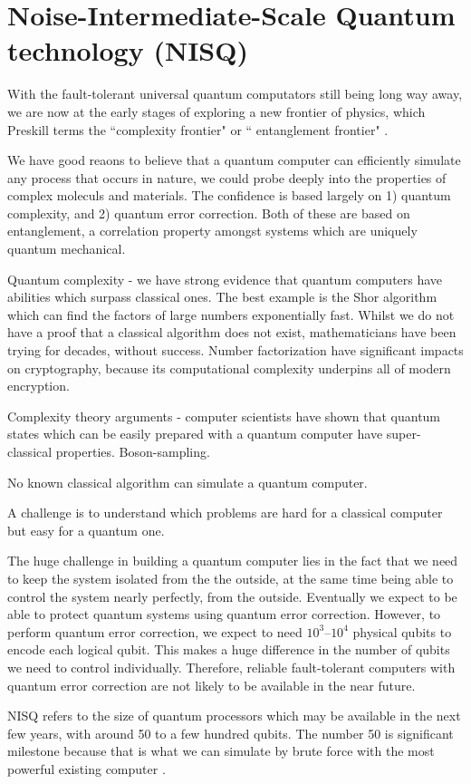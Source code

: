 \section{Noise-Intermediate-Scale Quantum technology (NISQ)}

With the fault-tolerant universal quantum computators still being long way away, we are now
at the early stages of exploring a new frontier of physics, which Preskill terms the 
``complexity frontier" or `` entanglement frontier" \cite{}.

We have good reaons to believe that a quantum computer can efficiently simulate any process that occurs in nature, we could probe deeply into the properties of complex moleculs and materials. The confidence is based largely on 1) quantum complexity, and 2) quantum error correction. Both of these are based on entanglement, a correlation property amongst systems which are uniquely quantum mechanical. 

Quantum complexity - we have strong evidence that quantum computers have abilities which surpass classical ones. The best example is the Shor algorithm \cite{} which can find the factors of large numbers exponentially fast. Whilst we do not have a proof that a classical algorithm does not exist, mathematicians have been trying for decades, without success. Number factorization have significant impacts on cryptography, because its computational complexity underpins all of modern encryption. 

Complexity theory arguments - computer scientists have shown that quantum states which 
can be easily prepared with a quantum computer have super-classical properties. Boson-sampling.

No known classical algorithm can simulate a quantum computer.

A challenge is to understand which problems are hard for a classical computer but easy for a quantum one.


The huge challenge in building a quantum computer lies in the fact that we need to keep the system isolated from the the outside, at the same time being able to control the system nearly perfectly, from the outside. Eventually we expect to be able to protect quantum systems using quantum error correction. However, to perform quantum error correction, we expect to need $10^3 – 10^4$ physical qubits to encode each logical qubit. This makes a huge difference in the number of qubits we need to control individually. Therefore, reliable fault-tolerant computers with quantum error correction are not likely to be available in the near future.



NISQ refers to the size of quantum processors which may be available in the next few years, with 
around 50 to a few hundred qubits. The number 50 is significant milestone because that is what we can simulate by brute force with the most powerful existing computer \cite{}.


